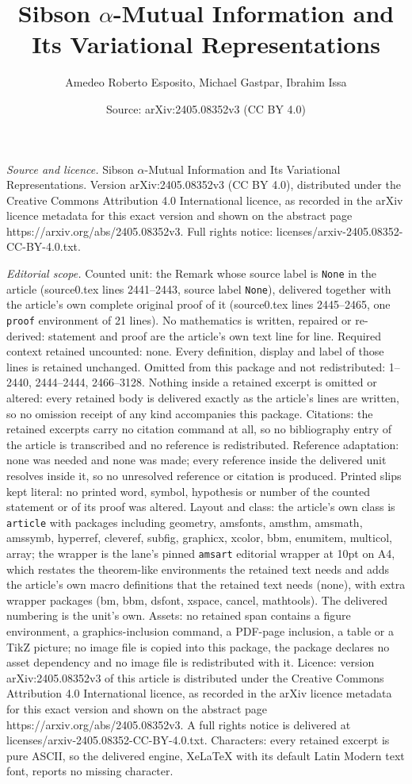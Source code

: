 \documentclass[10pt,a4paper]{amsart}
\title[Sibson $\alpha$-Mutual Information and Its Variational Repre]{Sibson $\alpha$-Mutual Information and Its Variational Representations}
\author{Amedeo Roberto Esposito, Michael Gastpar, Ibrahim Issa}
\date{Source: arXiv:2405.08352v3 (CC BY 4.0)}
\begin{document}
\maketitle

\noindent\emph{Source and licence.} Sibson $\alpha$-Mutual Information and Its Variational Representations. Version arXiv:2405.08352v3 (CC BY 4.0), distributed under the Creative Commons Attribution 4.0 International licence, as recorded in the arXiv licence metadata for this exact version and shown on the abstract page https://arxiv.org/abs/2405.08352v3. Full rights notice: licenses/arxiv-2405.08352-CC-BY-4.0.txt.\par\smallskip

\noindent\textit{Editorial scope.} Counted unit: the Remark whose source label is \texttt{None} in the article (source0.tex lines 2441--2443, source label \texttt{None}), delivered together with the article's own complete original proof of it (source0.tex lines 2445--2465, one \texttt{proof} environment of 21 lines). No mathematics is written, repaired or re-derived: statement and proof are the article's own text line for line. Required context retained uncounted: none. Every definition, display and label of those lines is retained unchanged. Omitted from this package and not redistributed: 1--2440, 2444--2444, 2466--3128. Nothing inside a retained excerpt is omitted or altered: every retained body is delivered exactly as the article's lines are written, so no omission receipt of any kind accompanies this package. Citations: the retained excerpts carry no citation command at all, so no bibliography entry of the article is transcribed and no reference is redistributed. Reference adaptation: none was needed and none was made; every reference inside the delivered unit resolves inside it, so no unresolved reference or citation is produced. Printed slips kept literal: no printed word, symbol, hypothesis or number of the counted statement or of its proof was altered. Layout and class: the article's own class is \texttt{article} with packages including geometry, amsfonts, amsthm, amsmath, amssymb, hyperref, cleveref, subfig, graphicx, xcolor, bbm, enumitem, multicol, array; the wrapper is the lane's pinned \texttt{amsart} editorial wrapper at 10pt on A4, which restates the theorem-like environments the retained text needs and adds the article's own macro definitions that the retained text needs (none), with extra wrapper packages (bm, bbm, dsfont, xspace, cancel, mathtools). The delivered numbering is the unit's own. Assets: no retained span contains a figure environment, a graphics-inclusion command, a PDF-page inclusion, a table or a TikZ picture; no image file is copied into this package, the package declares no asset dependency and no image file is redistributed with it. Licence: version arXiv:2405.08352v3 of this article is distributed under the Creative Commons Attribution 4.0 International licence, as recorded in the arXiv licence metadata for this exact version and shown on the abstract page https://arxiv.org/abs/2405.08352v3. A full rights notice is delivered at licenses/arxiv-2405.08352-CC-BY-4.0.txt. Characters: every retained excerpt is pure ASCII, so the delivered engine, XeLaTeX with its default Latin Modern text font, reports no missing character.
\end{document}
